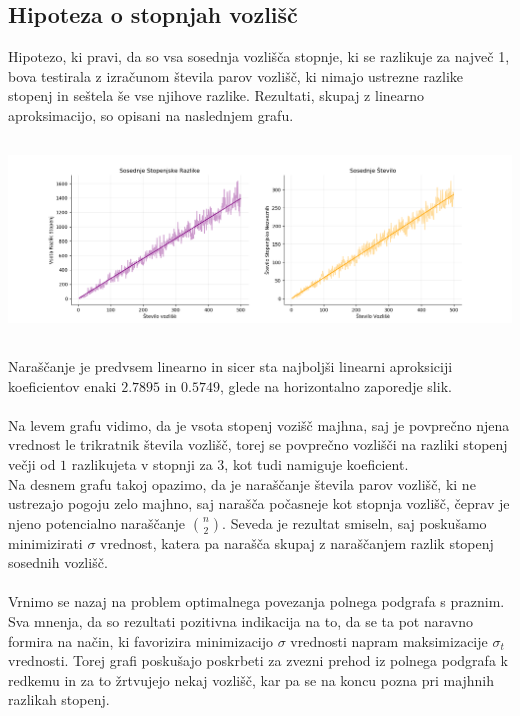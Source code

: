 \documentclass[ letterpaper, titlepage, fleqn]{article}
\begin{document}
\subsection{Hipoteza o stopnjah vozlišč}
Hipotezo, ki pravi, da so vsa sosednja vozlišča stopnje, ki se razlikuje za največ 1, bova testirala
z izračunom števila parov vozlišč, ki nimajo ustrezne razlike stopenj in seštela še vse njihove razlike.
Rezultati, skupaj z linearno aproksimacijo, so opisani na naslednjem grafu.\\
\includegraphics[width=\textwidth, height=6cm]{graphics/degree_difference_linear_aproximation.png}\\
Naraščanje je predvsem linearno in sicer sta najboljši linearni aproksiciji koeficientov enaki
$2.7895$ in $0.5749$, glede na horizontalno zaporedje slik.
\\\\
Na levem grafu vidimo, da je vsota stopenj vozišč majhna, saj je povprečno njena vrednost
le trikratnik števila vozlišč, torej se povprečno vozlišči na razliki stopenj večji od $1$ razlikujeta v stopnji za $3$, 
kot tudi namiguje koeficient.\\
Na desnem grafu takoj opazimo, da je naraščanje števila parov vozlišč, ki ne ustrezajo pogoju
zelo majhno, saj narašča počasneje kot stopnja vozlišč, čeprav je njeno potencialno naraščanje
$\binom{n}{2}$. 
Seveda je rezultat smiseln, saj poskušamo minimizirati $\sigma$ vrednost, katera pa narašča
skupaj z naraščanjem razlik stopenj sosednih vozlišč. 
\\\\
Vrnimo se nazaj na problem optimalnega povezanja polnega podgrafa s praznim. 
Sva mnenja, da so rezultati pozitivna indikacija na to, da se ta pot naravno formira na način, 
ki favorizira minimizacijo $\sigma$ vrednosti napram maksimizacije $\sigma_t$ vrednosti.
Torej grafi poskušajo poskrbeti za zvezni prehod iz polnega podgrafa k redkemu in za to 
žrtvujejo nekaj vozlišč, kar pa se na koncu pozna pri majhnih razlikah stopenj.
\end{document}
